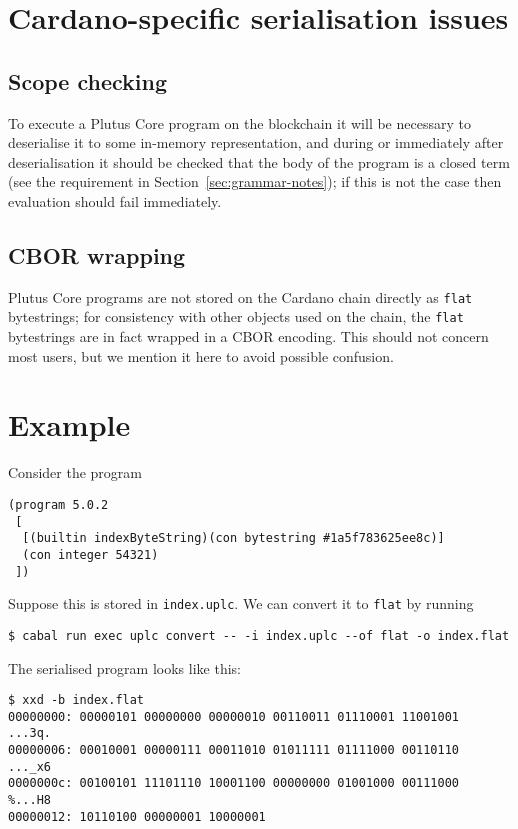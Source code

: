 \begin{table}[H]
\section{Cardano-specific serialisation issues}
\label{sec:cardano-issues}
\subsection{Scope checking}
To execute a Plutus Core program on the blockchain it will be necessary to
deserialise it to some in-memory representation, and during or immediately after
deserialisation it should be checked that the body of the program is a closed
term (see the requirement in Section~\ref{sec:grammar-notes}); if this is not
the case then evaluation should fail immediately.

\subsection{CBOR wrapping}
Plutus Core programs are not stored on the Cardano chain directly as
\texttt{flat} bytestrings; for consistency with other objects used on the chain,
the \texttt{flat} bytestrings are in fact wrapped in a CBOR encoding.  This
should not concern most users, but we mention it here to avoid possible
confusion.



\section{Example}
Consider the program
\begin{verbatim}
(program 5.0.2
 [
  [(builtin indexByteString)(con bytestring #1a5f783625ee8c)]
  (con integer 54321)
 ])
\end{verbatim}

\noindent Suppose this is stored in \texttt{index.uplc}.  We can convert it to
\texttt{flat} by running
\begin{verbatim}
$ cabal run exec uplc convert -- -i index.uplc --of flat -o index.flat
\end{verbatim}

\noindent The serialised program looks like this:

{\small
\begin{verbatim}
$ xxd -b index.flat
00000000: 00000101 00000000 00000010 00110011 01110001 11001001  ...3q.
00000006: 00010001 00000111 00011010 01011111 01111000 00110110  ..._x6
0000000c: 00100101 11101110 10001100 00000000 01001000 00111000  %...H8
00000012: 10110100 00000001 10000001
\end{verbatim}
}


\end{table}
